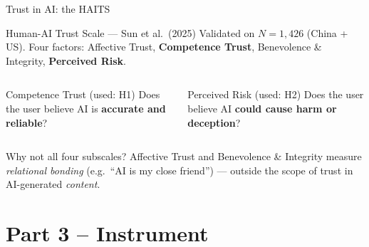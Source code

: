 \documentclass[10pt,aspectratio=169]{beamer}
\begin{document}
\begin{frame}{Trust in AI: the HAITS}
  \begin{block}{Human-AI Trust Scale --- Sun et al.\ (2025)}
    Validated on $N = 1{,}426$ (China + US).
    Four factors: Affective Trust, \textbf{Competence Trust},
    Benevolence \& Integrity, \textbf{Perceived Risk}.
  \end{block}
  \pause
  \begin{columns}[T]
    \begin{block}{Competence Trust (used: H1)}
      Does the user believe AI is \textbf{accurate and reliable}?\\[4pt]
    \end{block}
    \begin{block}{Perceived Risk (used: H2)}
      Does the user believe AI \textbf{could cause harm or deception}?\\[4pt]
    \end{block}
  \end{columns}
  \medskip
  \begin{alertblock}{Why not all four subscales?}
    Affective Trust and Benevolence \& Integrity measure \emph{relational bonding}
    (e.g.\ ``AI is my close friend'') --- outside the scope of trust in AI-generated
    \emph{content}.
  \end{alertblock}
\end{frame}

\section{Part 3 -- Instrument}
\end{document}
